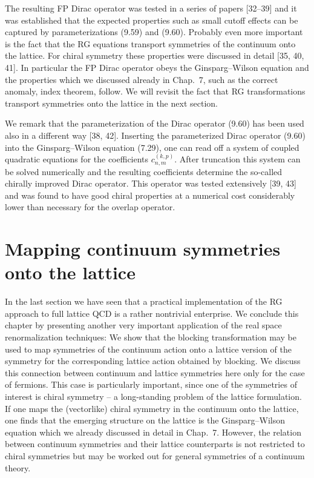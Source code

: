 The resulting FP Dirac operator was tested in a series of papers [32--39] and
it was established that the expected properties such as small cutoff effects
can be captured by parameterizations (9.59) and (9.60). Probably even more
important is the fact that the RG equations transport symmetries of the
continuum onto the lattice. For chiral symmetry these properties were
discussed in detail [35, 40, 41]. In particular the FP Dirac operator obeys
the Ginsparg--Wilson equation and the properties which we discussed already in
Chap.~7, such as the correct anomaly, index theorem, follow. We will revisit
the fact that RG transformations transport symmetries onto the lattice in the
next section.

We remark that the parameterization of the Dirac operator (9.60) has been used
also in a different way [38, 42]. Inserting the parameterized Dirac operator
(9.60) into the Ginsparg--Wilson equation (7.29), one can read off a system of
coupled quadratic equations for the coefficients $c^{(k,p)}_{n,m}$. After
truncation this system can be solved numerically and the resulting
coefficients determine the so-called chirally improved Dirac operator. This
operator was tested extensively [39, 43] and was found to have good chiral
properties at a numerical cost considerably lower than necessary for the
overlap operator.

\section{Mapping continuum symmetries onto the lattice}
\label{sec:9.4}

In the last section we have seen that a practical implementation of the RG
approach to full lattice QCD is a rather nontrivial enterprise. We conclude
this chapter by presenting another very important application of the real
space renormalization techniques: We show that the blocking transformation may
be used to map symmetries of the continuum action onto a lattice version of
the symmetry for the corresponding lattice action obtained by blocking. We
discuss this connection between continuum and lattice symmetries here only for
the case of fermions. This case is particularly important, since one of the
symmetries of interest is chiral symmetry -- a long-standing problem of the
lattice formulation. If one maps the (vectorlike) chiral symmetry in the
continuum onto the lattice, one finds that the emerging structure on the
lattice is the Ginsparg--Wilson equation which we already discussed in detail
in Chap.~7. However, the relation between continuum symmetries and their
lattice counterparts is not restricted to chiral symmetries but may be worked
out for general symmetries of a continuum theory.

